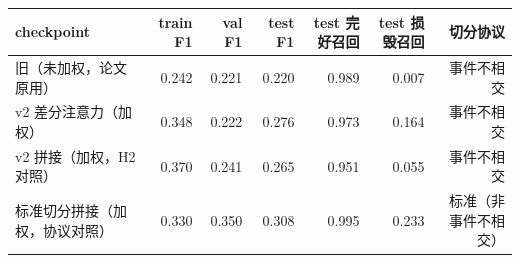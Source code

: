 \begin{tabular}{lrrrrrr}
\hline
checkpoint & train F1 & val F1 & test F1 & test 完好召回 & test 损毁召回 & 切分协议 \\
\hline
旧（未加权，论文原用） & 0.242 & 0.221 & 0.220 & 0.989 & 0.007 & 事件不相交 \\
v2 差分注意力（加权） & 0.348 & 0.222 & 0.276 & 0.973 & 0.164 & 事件不相交 \\
v2 拼接（加权，H2 对照） & 0.370 & 0.241 & 0.265 & 0.951 & 0.055 & 事件不相交 \\
标准切分拼接（加权，协议对照） & 0.330 & 0.350 & 0.308 & 0.995 & 0.233 & 标准（非事件不相交） \\
\hline
\end{tabular}
